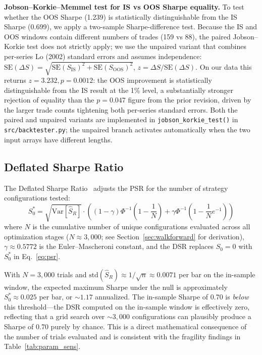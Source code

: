 \documentclass{article}
\newcommand{\Var}{\mathrm{Var}}
\begin{document}
\textbf{Jobson--Korkie--Memmel test for IS vs OOS Sharpe equality.}
To test whether the OOS Sharpe (1.239) is statistically distinguishable from the IS Sharpe (0.699), we apply a two-sample Sharpe-difference test.
Because the IS and OOS windows contain different numbers of trades (159 vs 88), the paired Jobson--Korkie test does not strictly apply; we use the unpaired variant that combines per-series Lo (2002) standard errors and assumes independence: $\text{SE}(\Delta S) = \sqrt{\text{SE}(S_{\text{IS}})^2 + \text{SE}(S_{\text{OOS}})^2}$, $z = \Delta S / \text{SE}(\Delta S)$.
On our data this returns $z = 3.232, p = 0.0012$: the OOS improvement is statistically distinguishable from the IS result at the 1\% level, a substantially stronger rejection of equality than the $p = 0.047$ figure from the prior revision, driven by the larger trade counts tightening both per-series standard errors.
Both the paired and unpaired variants are implemented in \texttt{jobson\_korkie\_test()} in \texttt{src/backtester.py}; the unpaired branch activates automatically when the two input arrays have different lengths.

\subsection{Deflated Sharpe Ratio}

The Deflated Sharpe Ratio~\citep{Bailey2014DSR} adjusts the PSR for the number of strategy configurations tested:
\begin{equation}
  S_0^* = \sqrt{\Var[\hat{S}_R]} \cdot \left((1 - \gamma) \Phi^{-1}\!\left(1 - \frac{1}{N}\right) + \gamma \Phi^{-1}\!\left(1 - \frac{1}{N} e^{-1}\right)\right)
  \label{eq:dsr}
\end{equation}
where $N$ is the cumulative number of unique configurations evaluated across all optimization stages ($N \approx 3{,}000$; see Section~\ref{sec:walkforward} for derivation), $\gamma \approx 0.5772$ is the Euler--Mascheroni constant, and the DSR replaces $S_0 = 0$ with $S_0^*$ in Eq.~\eqref{eq:psr}.

With $N = 3{,}000$ trials and $\text{std}(\hat{S}_R) \approx 1/\sqrt{n} \approx 0.0071$ per bar on the in-sample window, the expected maximum Sharpe under the null is approximately $S_0^* \approx 0.025$ per bar, or ${\sim}1.17$ annualized.
The in-sample Sharpe of 0.70 is \emph{below} this threshold---the DSR computed on the in-sample window is effectively zero, reflecting that a grid search over $\sim 3{,}000$ configurations can plausibly produce a Sharpe of 0.70 purely by chance.
This is a direct mathematical consequence of the number of trials evaluated and is consistent with the fragility findings in Table~\ref{tab:param_sens}.
\end{document}
